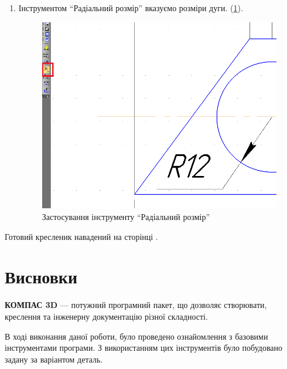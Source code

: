 \begin{enumerate}[leftmargin=*]
  \newpage
\item Інструментом ``Радіальний розмір'' вказуємо розміри дуги. (\ref{fig:lab3:radial_dimentions}).
  \begin{figure}[!ht]
    \centering \includegraphics[width=0.9\linewidth]{./images/lab3/step7.png}
    \caption{Застосування інструменту ``Радіальний розмір''}
    \label{fig:lab3:radial_dimentions} 
  \end{figure}

\end{enumerate}

\FloatBarrier Готовий кресленик навадений на сторінці \pageref{lab3:pdf:drawing}.
\newpage
\NoBgThispage
\label{lab3:pdf:drawing}
 \BorderText

\newpage
\section*{Висновки}

\textbf{КОМПАС 3D} --- потужний програмний пакет, що дозволяє створювати, креслення та інженерну
документацію різної складності.

В ході виконання даної роботи, було проведено ознайомлення з
базовими інструментами програми. З використанням цих інструментів було побудовано задану за
варіантом деталь.

